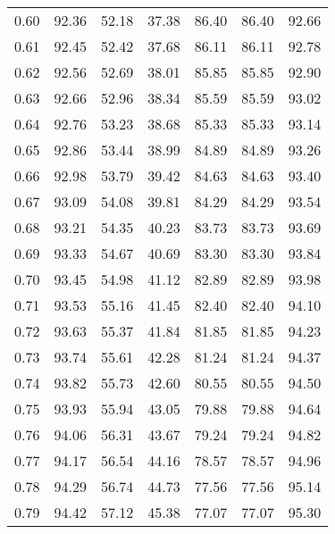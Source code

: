 \begin{tabular}{|c|c|c|c|c|c|c|}
      0.60 &     92.36 &     52.18 &      37.38 &   86.40 &      86.40 &         92.66 \\
      0.61 &     92.45 &     52.42 &      37.68 &   86.11 &      86.11 &         92.78 \\
      0.62 &     92.56 &     52.69 &      38.01 &   85.85 &      85.85 &         92.90 \\
      0.63 &     92.66 &     52.96 &      38.34 &   85.59 &      85.59 &         93.02 \\
      0.64 &     92.76 &     53.23 &      38.68 &   85.33 &      85.33 &         93.14 \\
      0.65 &     92.86 &     53.44 &      38.99 &   84.89 &      84.89 &         93.26 \\
      0.66 &     92.98 &     53.79 &      39.42 &   84.63 &      84.63 &         93.40 \\
      0.67 &     93.09 &     54.08 &      39.81 &   84.29 &      84.29 &         93.54 \\
      0.68 &     93.21 &     54.35 &      40.23 &   83.73 &      83.73 &         93.69 \\
      0.69 &     93.33 &     54.67 &      40.69 &   83.30 &      83.30 &         93.84 \\
      0.70 &     93.45 &     54.98 &      41.12 &   82.89 &      82.89 &         93.98 \\
      0.71 &     93.53 &     55.16 &      41.45 &   82.40 &      82.40 &         94.10 \\
      0.72 &     93.63 &     55.37 &      41.84 &   81.85 &      81.85 &         94.23 \\
      0.73 &     93.74 &     55.61 &      42.28 &   81.24 &      81.24 &         94.37 \\
      0.74 &     93.82 &     55.73 &      42.60 &   80.55 &      80.55 &         94.50 \\
      0.75 &     93.93 &     55.94 &      43.05 &   79.88 &      79.88 &         94.64 \\
      0.76 &     94.06 &     56.31 &      43.67 &   79.24 &      79.24 &         94.82 \\
      0.77 &     94.17 &     56.54 &      44.16 &   78.57 &      78.57 &         94.96 \\
      0.78 &     94.29 &     56.74 &      44.73 &   77.56 &      77.56 &         95.14 \\
      0.79 &     94.42 &     57.12 &      45.38 &   77.07 &      77.07 &         95.30 \\

\end{tabular}
